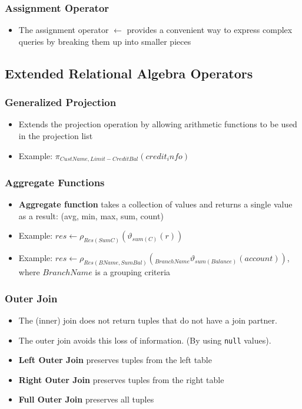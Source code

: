 \subsubsection{Assignment Operator}
\begin{itemize}
    \item The assignment operator $\leftarrow$ provides a convenient way to express complex queries by breaking them up into smaller pieces
\end{itemize}

\subsection{Extended Relational Algebra Operators}

\subsubsection{Generalized Projection}
\begin{itemize}
    \item Extends the projection operation by allowing arithmetic functions to be used in the projection list
    \item Example: $\pi_{CustName, Limit - CreditBal}(credit_info)$
\end{itemize}
\subsubsection{Aggregate Functions}
\begin{itemize}
    \item \textbf{Aggregate function} takes a collection of values and returns a single value as a result: (avg, min, max, sum, count)
    \item Example: $res \leftarrow \rho_{Res(SumC)} ( \vartheta _{sum(C)} (r))$
    \item Example: $res \leftarrow \rho_{Res(BName,SumBal)}(_{BranchName} \vartheta_{sum(Balance)}(account))$, where $BranchName$ is a grouping criteria
\end{itemize}
\subsubsection{Outer Join}
\begin{itemize}
    \item The (inner) join does not return tuples that do not have a join partner.
    \item The outer join avoids this loss of information. (By using \texttt{null} values).
    \item \textbf{Left Outer Join} preserves tuples from the left table
    \item \textbf{Right Outer Join} preserves tuples from the right table
    \item \textbf{Full Outer Join} preserves all tuples
\end{itemize}

